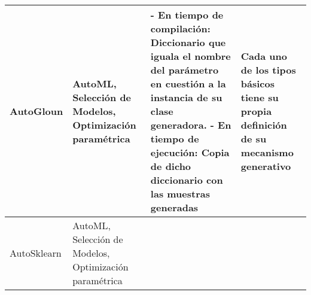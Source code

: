 \begin{longtable}{  p{2.5cm}  p{4cm}  p{6.8cm}  p{6.5cm} }
    \hline
    AutoGloun                                                                                                                                                                                                                                                                                                                                                     &
    AutoML, Selección de Modelos, Optimización paramétrica                                                                                                                                                                                                                                                                                                        &
    - En tiempo de compilación: Diccionario que iguala el nombre del parámetro en cuestión a la instancia de su clase generadora. \newline- En tiempo de ejecución: Copia de dicho diccionario con las muestras generadas                                                                                                                                         &
    Cada uno de los tipos básicos tiene su propia definición de su mecanismo generativo                                                                                                                                                                                                                                                                             \\
    \hline
    \rowcolor{lavender}
    AutoSklearn                                                                                                                                                                                                                                                                                                                                                   &
    AutoML, Selección de Modelos, Optimización paramétrica                                                                                                                                                                                                                                                                                                        &

\end{longtable}
